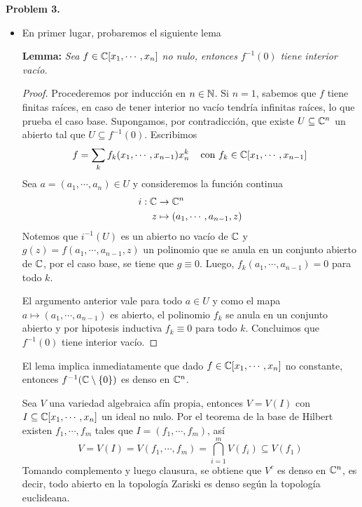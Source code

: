 \documentclass{article}
\begin{document}
\newpage
\noindent\textbf{Problem 3.}
\begin{itemize}
    \item[(a)] En primer lugar, probaremos el siguiente lema
    
    \vspace{1mm}
    \noindent\textbf{Lemma:} \emph{Sea $f\in\mathbb{C}[x_{1},\cdots,x_{n}]$ no nulo, entonces 
    $f^{-1}(0)$ tiene interior vacío.}

    \begin{proof}
        Procederemos por inducción en $n\in\mathbb{N}$. Si $n=1$, sabemos que $f$ tiene finitas raíces, en
        caso de tener interior no vacío tendría infinitas raíces, lo que prueba el caso base.
        Supongamos, por contradicción, que existe $U\subseteq\mathbb{C}^{n}$ un abierto tal que 
        $U\subseteq f^{-1}(0)$. Escribimos
        \begin{equation*}
            f=\sum_{k}f_{k}(x_{1},\cdots,x_{n-1})x_{n}^{k}
            \hspace{4mm}\text{con } f_{k}\in\mathbb{C}[x_{1},\cdots,x_{n-1}]
        \end{equation*}
        Sea $a=(a_{1},\cdots,a_{n})\in U$ y consideremos la función continua
        \begin{align*}
            i:\mathbb{C} &\to \mathbb{C}^{n} \\
            z & \mapsto (a_{1},\cdots,a_{n-1},z)
        \end{align*}
        Notemos que $i^{-1}(U)$ es un abierto no vacío de $\mathbb{C}$ y $g(z)=f(a_{1},\cdots,a_{n-1},z)$ 
        un polinomio que se anula en un conjunto abierto de $\mathbb{C}$, por el caso base, se tiene que
        $g\equiv0$. Luego, $f_{k}(a_{1},\cdots,a_{n-1})=0$ para todo $k$.

        \vspace{1mm}
        El argumento anterior vale para todo $a\in U$ y como el mapa 
        $a\mapsto(a_{1},\cdots,a_{n-1})$ es abierto, el polinomio $f_{k}$ se anula en un conjunto
        abierto y por hipotesis inductiva $f_{k}\equiv0$ para todo $k$. Concluimos que $f^{-1}(0)$ 
        tiene interior vacío.
    \end{proof}

    El lema implica inmediatamente que dado $f\in\mathbb{C}[x_{1},\cdots,x_{n}]$ no constante, entonces
    $f^{-1}(\mathbb{C}\setminus\{0\})$ es denso en $\mathbb{C}^{n}$.

    \vspace{1mm}
    Sea $V$ una variedad algebraica afín propia, entonces $V=V(I)$ con 
    $I\subseteq\mathbb{C}[x_{1},\cdots,x_{n}]$ un ideal no nulo. Por el teorema de la base de Hilbert 
    existen $f_{1},\cdots,f_{m}$ tales que $I=(f_{1},\cdots,f_{m})$, así
    \begin{equation*}
        V=V(I)=V(f_{1},\cdots,f_{m})=\bigcap_{i=1}^{m}V(f_{i})\subseteq V(f_{1})
    \end{equation*}
    Tomando complemento y luego clausura, se obtiene que $V^{c}$ es denso en $\mathbb{C}^{n}$, es decir, 
    todo abierto en la topología Zariski es denso según la topología euclideana.


\end{itemize}
\end{document}
